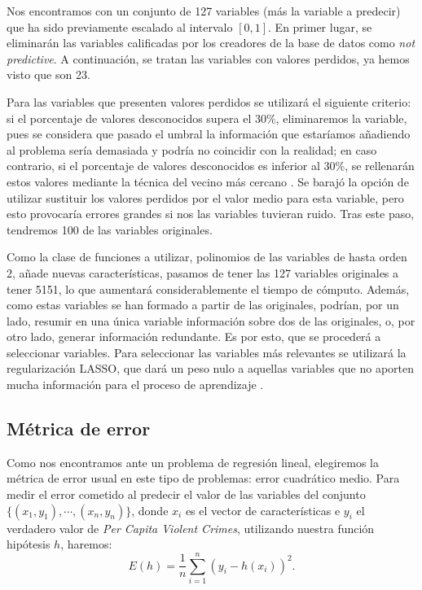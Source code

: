 \documentclass[a4paper, 20pt]{article}
\begin{document}
{Nos encontramos con un conjunto de 127 variables (más la variable a predecir) que ha sido previamente escalado al intervalo $[0,1]$. En primer lugar, se eliminarán las variables calificadas por los creadores de la base de datos como \textit{not predictive}. A continuación, se tratan las variables con valores perdidos, ya hemos visto que son 23.  

Para las variables que presenten valores perdidos se utilizará el siguiente criterio: si el porcentaje de valores desconocidos supera el 30\%, eliminaremos la variable, pues se considera que pasado el umbral la información que estaríamos añadiendo al problema sería demasiada y podría no coincidir con la realidad; en caso contrario, si el porcentaje de valores desconocidos es inferior al 30\%, se rellenarán estos valores mediante la técnica del vecino más cercano \cite{knnimputer}. Se barajó la opción de utilizar sustituir los valores perdidos por el valor medio para esta variable, pero esto provocaría errores grandes si nos las variables tuvieran ruido. Tras este paso, tendremos 100 de las variables originales.

Como la clase de funciones a utilizar, polinomios de las variables de hasta orden 2, añade nuevas características, pasamos de tener las 127 variables originales a tener 5151, lo que aumentará considerablemente el tiempo de cómputo. Además, como estas variables se han formado a partir de las originales, podrían, por un lado, resumir en una única variable información sobre dos de las originales, o, por otro lado, generar información redundante. Es por esto, que se procederá a seleccionar variables. Para seleccionar las variables más relevantes se utilizará la regularización LASSO, que dará un peso nulo a aquellas variables que no aporten mucha información para el proceso de aprendizaje \cite{lasso}. 

\subsection{Métrica de error}
Como nos encontramos ante un problema de regresión lineal, elegiremos la métrica de error usual en este tipo de problemas: error cuadrático medio. Para medir el error cometido al predecir el valor de las variables del conjunto $\{(x_1,y_1),\cdots,(x_n,y_n)\}$, donde $x_i$ es el vector de características e $y_i$ el verdadero valor de \textit{Per Capita Violent Crimes}, utilizando nuestra función hipótesis $h$, haremos:\[
E(h) = \frac{1}{n}\sum_{i=1}^n\left(y_i-h(x_i)\right)^2.
\]

}
\end{document}
